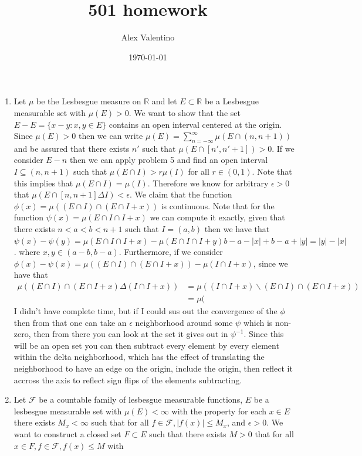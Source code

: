 \documentclass[12pt, letterpaper]{article}
\date{\today}
\author{Alex Valentino}
\title{501 homework}
\newcommand{\R}{\mathbb{R}}
\begin{document}
\begin{enumerate}
	\item[6] Let $\mu$ be the Lesbesgue measure on $\R$ and let $E \subset \R$ be a Lesbesgue measurable set with 
	$\mu(E) > 0$.  We want to show that the set $E - E = \{ x - y: x,y \in E\}$
	contains an open interval centered at the origin.  Since $\mu(E) > 0$ then we can
	write $\mu(E) = \sum_{n = -\infty}^\infty \mu(E \cap (n,n+1))$ and be assured that 
	there exists $n'$ such that $\mu(E \cap [n',n'+1]) > 0$.  If we consider $E - n$ 
	then we can apply problem 5 and find an open interval $I \subseteq (n,n+1)$ such that $\mu(E \cap I) > r \mu(I)$ for all $r \in (0,1)$.  Note that this implies that 
	$\mu(E \cap I) = \mu(I)$.  Therefore we know for arbitrary $\epsilon > 0$ 
	that $\mu(E \cap [n,n+1] \Delta I) < \epsilon$.  We claim that the function 
	$\phi(x) = \mu((E\cap I)\cap (E \cap I + x))$ is continuous.  Note that for the 
	function $\psi(x) = \mu(E \cap I \cap I + x)$ we can compute it exactly, given that 
	there exists $n < a < b < n+1$ such that $I = (a,b)$ then we have that 
	$\psi(x) - \psi(y) = \mu( E \cap I \cap I + x) - \mu(E \cap I \cap I + y)  b - a - |x| + b - a + |y| = |y| - |x|$.  where $x,y \in (a-b, b -a)$.  Furthermore, if we consider 
	$\phi(x) - \psi(x) = \mu((E\cap I)\cap (E \cap I + x)) - \mu(I \cap I + x)$, 
	since we have that 
	\begin{align*}
	\mu((E\cap I)\cap (E \cap I + x) \Delta (I \cap I + x)) &= \mu( (I \cap I + x) \backslash (E\cap I)\cap (E \cap I + x))\\
	&= \mu(
	\end{align*}
	I didn't have complete time, but if I could sus out the convergence of the 
	$\phi$ then from that one can take an $\epsilon$ neighborhood around some $\psi$ 
	which is non-zero, then from there you can look at the set it gives out in $\psi^{-1}$.  Since this will be an open set you can then subtract every element by 
	every element within the delta neighborhood, which has the effect of translating
	the neighborhood to have an edge on the origin, include the origin, then reflect
	it accross the axis to reflect sign flips of the elements subtracting.
	\item[7] Let $\mathcal{F}$ be a countable family of lesbesgue measurable functions, $E$ be a lesbesgue measurable set with $\mu(E) < \infty$ with the property for each 
	$x \in E$ there exists $M_x < \infty$ such that for all $f \in \mathcal{F}, |f(x)| \leq M_x$, and $\epsilon >0$.  We want to construct a closed set $F \subset E$ such that there exists $M > 0$ that for all $x \in F, f \in \mathcal{F}, f(x) \leq M$ with 

\end{enumerate}
\end{document}
